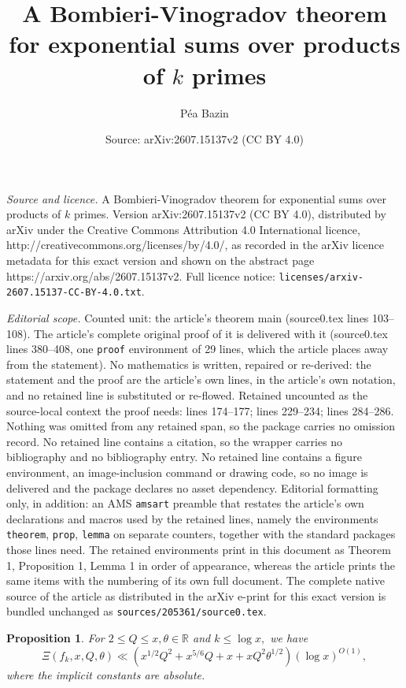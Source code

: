 \documentclass[10pt,a4paper]{amsart}
\title{A Bombieri-Vinogradov theorem for exponential sums over products of $k$ primes}
\author{P\'ea Bazin}
\date{Source: arXiv:2607.15137v2 (CC BY 4.0)}
\newtheorem{prop}{Proposition}
\newcommand{\R}{\mathds{R}}
\begin{document}
\maketitle

\noindent\emph{Source and licence.} A Bombieri-Vinogradov theorem for exponential sums over products of $k$ primes. Version arXiv:2607.15137v2 (CC BY 4.0), distributed by arXiv under the Creative Commons Attribution 4.0 International licence, http://creativecommons.org/licenses/by/4.0/, as recorded in the arXiv licence metadata for this exact version and shown on the abstract page https://arxiv.org/abs/2607.15137v2. Full licence notice: \texttt{licenses/arxiv-2607.15137-CC-BY-4.0.txt}.\par\smallskip

\noindent\textit{Editorial scope.} Counted unit: the article's theorem main (source0.tex lines 103--108). The article's complete original proof of it is delivered with it (source0.tex lines 380--408, one \texttt{proof} environment of 29 lines, which the article places away from the statement). No mathematics is written, repaired or re-derived: the statement and the proof are the article's own lines, in the article's own notation, and no retained line is substituted or re-flowed.  Retained uncounted as the source-local context the proof needs: lines 174--177; lines 229--234; lines 284--286.  Nothing was omitted from any retained span, so the package carries no omission record.  No retained line contains a citation, so the wrapper carries no bibliography and no bibliography entry.  No retained line contains a figure environment, an image-inclusion command or drawing code, so no image is delivered and the package declares no asset dependency.  Editorial formatting only, in addition: an AMS \texttt{amsart} preamble that restates the article's own declarations and macros used by the retained lines, namely the environments \texttt{theorem}, \texttt{prop}, \texttt{lemma} on separate counters, together with the standard packages those lines need.  The retained environments print in this document as Theorem 1, Proposition 1, Lemma 1 in order of appearance, whereas the article prints the same items with the numbering of its own full document.  The complete native source of the article as distributed in the arXiv e-print for this exact version is bundled unchanged as \texttt{sources/205361/source0.tex}.
\begin{prop}\label{xi-pik}
    For $2\le Q \le x, \theta\in\R$ and $k \le \log x,$ we have
    $$\Xi(f_k, x, Q,\theta) \ll \left(x^{1/2}Q^2 + x^{5/6}Q + x + xQ^2\theta^{1/2}\right)(\log x)^{O(1)},$$ where the implicit constants are absolute.
\end{prop}
\end{document}
